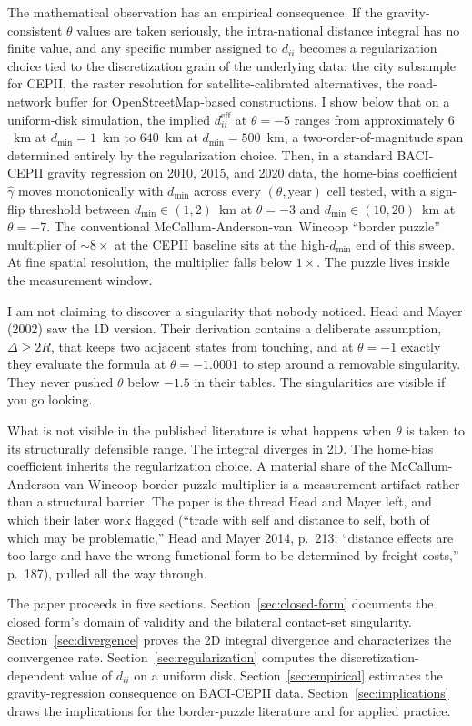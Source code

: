 \documentclass[11pt, letterpaper]{article}
\theoremstyle{definition}
\newcommand{\eff}{\mathrm{eff}}
\newcommand{\dii}{d_{ii}}
\begin{document}
The mathematical observation has an empirical consequence. If the
gravity-consistent $\theta$ values are taken seriously, the
intra-national distance integral has no finite value, and any specific
number assigned to $\dii$ becomes a regularization choice tied to the
discretization grain of the underlying data: the city subsample for
CEPII, the raster resolution for satellite-calibrated alternatives,
the road-network buffer for OpenStreetMap-based constructions. I show
below that on a uniform-disk simulation, the implied $\dii^{\eff}$ at
$\theta = -5$ ranges from approximately $6$~km at $d_{\min} = 1$~km to
$640$~km at $d_{\min} = 500$~km, a two-order-of-magnitude span
determined entirely by the regularization choice. Then, in a standard
BACI-CEPII gravity regression on 2010, 2015, and 2020 data, the home-bias
coefficient $\hat{\gamma}$ moves monotonically with $d_{\min}$ across
every $(\theta, \text{year})$ cell tested, with a sign-flip threshold
between $d_{\min} \in (1, 2)$~km at $\theta = -3$ and
$d_{\min} \in (10, 20)$~km at $\theta = -7$. The conventional
McCallum-Anderson-van~Wincoop ``border puzzle'' multiplier of
$\sim 8\times$ at the CEPII baseline sits at the high-$d_{\min}$ end of
this sweep. At fine spatial resolution, the multiplier falls below
$1\times$. The puzzle lives inside the measurement window.

I am not claiming to discover a singularity that nobody noticed. Head
and Mayer (2002) saw the 1D version. Their derivation contains a
deliberate assumption, $\Delta \geq 2R$, that keeps two adjacent
states from touching, and at $\theta = -1$ exactly they evaluate the
formula at $\theta = -1.0001$ to step around a removable singularity.
They never pushed $\theta$ below $-1.5$ in their tables. The
singularities are visible if you go looking.

What is not visible in the published literature is what happens when
$\theta$ is taken to its structurally defensible range. The integral
diverges in 2D. The home-bias coefficient inherits the regularization
choice. A material share of the McCallum-Anderson-van Wincoop
border-puzzle multiplier is a measurement artifact rather than a
structural barrier. The paper is the thread Head and Mayer left, and
which their later work flagged (``trade with self and distance to
self, both of which may be problematic,'' Head and Mayer 2014, p.~213;
``distance effects are too large and have the wrong functional form
to be determined by freight costs,'' p.~187), pulled all the way
through.

The paper proceeds in five sections. Section~\ref{sec:closed-form}
documents the closed form's domain of validity and the bilateral
contact-set singularity. Section~\ref{sec:divergence} proves the 2D
integral divergence and characterizes the convergence rate.
Section~\ref{sec:regularization} computes the discretization-dependent
value of $\dii$ on a uniform disk. Section~\ref{sec:empirical} estimates
the gravity-regression consequence on BACI-CEPII data. Section~\ref{sec:implications}
draws the implications for the border-puzzle literature and for
applied practice.
\end{document}
